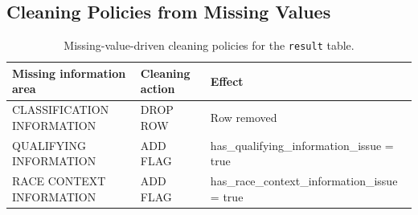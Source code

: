 \documentclass[11pt,a4paper]{article}
\begin{document}
	\subsection{Cleaning Policies from Missing Values}
	
		\begin{table}[H]
		\centering
		\small
		\caption{Missing-value-driven cleaning policies for the \texttt{result} table.}
		\label{tab:result-missing-cleaning}
		\begin{tabularx}{\linewidth}{
				>{\raggedright\arraybackslash}m{6cm}
				>{\raggedright\arraybackslash}m{4.2cm}
				>{\raggedright\arraybackslash}X
			}
			\toprule
			\textbf{Missing information area}
			& \textbf{Cleaning action}
			& \textbf{Effect} \\
			\midrule
			
			CLASSIFICATION INFORMATION
			& DROP ROW
			& { \scriptsize Row removed} \\
			
			\midrule
			
			QUALIFYING INFORMATION
			& ADD FLAG
			& {\scriptsize has\_qualifying\_information\_issue = true} \\
			
			\midrule
			
			RACE CONTEXT INFORMATION
			& ADD FLAG
			& {\scriptsize has\_race\_context\_information\_issue = true}  \\
			
			\bottomrule
		\end{tabularx}
	\end{table}
	
\end{document}
